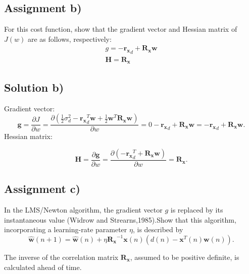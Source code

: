 \documentclass[a4paper, 12pt]{article}
\begin{document}
\subsection*{Assignment b)}
For this cost function, show that the gradient vector and Hessian matrix of $J(w)$ are as follows, respectively:
$$
\begin{array}{l}
   g = - \mathbf{r_x}_d +\mathbf{R_x}\mathbf{w}\\
   \mathbf{H} = \mathbf{R_x}
\end{array}
$$

\subsection*{Solution b)}
Gradient vector:
\begin{equation*}
  \mathbf{g}= \frac{\partial J}{\partial w} = \frac{\partial (\frac{1}{2}\sigma_d^2 - \mathbf{r_x}_d^T\mathbf{w} +\frac{1}{2}\mathbf{w}^T \mathbf{R_x} \mathbf{w})}{\partial w} = 0-\mathbf{r_x}_d+\mathbf{R_x} \mathbf{w} =-\mathbf{r_x}_d+\mathbf{R_x} \mathbf{w} .
\end{equation*}
Hessian matrix:

\begin{equation*}
  \mathbf{H}= \frac{\partial \mathbf{g}}{\partial w} = \frac{\partial (-\mathbf{r_x}_d^T+\mathbf{R_x} \mathbf{w})}{\partial w} = \mathbf{R_x}.
\end{equation*}

\subsection*{Assignment c)}

In the LMS/Newton algorithm, the gradient vector $g$ is replaced by its instantaneous value (Widrow and
Strearns,1985).Show that this algorithm, incorporating a learning-rate parameter $\eta$, is described by
\begin{equation*}
  \mathbf{\hat{w}}(n+1)= \mathbf{\hat{w}}(n)+\eta \mathbf{R_x}^{-1} \mathbf{x}(n)(d(n) - \mathbf{x}^T(n) \mathbf{w}(n) ).
\end{equation*}

The inverse of the correlation matrix $\mathbf{R_x}$, assumed to be positive definite, is calculated ahead of time.
\end{document}
